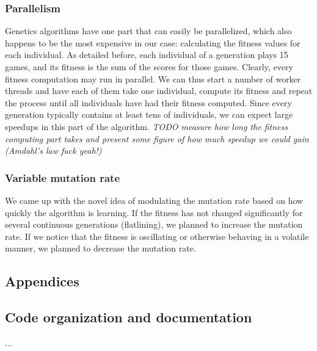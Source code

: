 \documentclass[10pt,a4paper]{report}
\begin{document}
\subsection{Parallelism}
Genetics algorithms have one part that can easily be parallelized, which also happens to be the most expensive in our case: calculating the fitness values for each individual. As detailed before, each individual of a generation plays 15 games, and its fitness is the sum of the scores for those games. Clearly, every fitness computation may run in parallel. We can thus start a number of worker threads and have each of them take one individual, compute its fitness and repeat the process until all individuals have had their fitness computed. Since every generation typically contains at least tens of individuals, we can expect large speedups in this part of the algorithm.
\textit{TODO measure how long the fitness computing part takes and present some figure of how much speedup we could gain (Amdahl's law fuck yeah!)}

\subsection{Variable mutation rate}
We came up with the novel idea of modulating the mutation rate based on how quickly the algorithm is learning. If the fitness has not changed significantly for several continuous generations (flatlining), we planned to increase the mutation rate. If we notice that the fitness is oscillating or otherwise behaving in a volatile manner, we planned to decrease the mutation rate.


\begin{appendices}
\chapter*{Appendices}
\section{Code organization and documentation}
...
\end{appendices}



\end{document}
